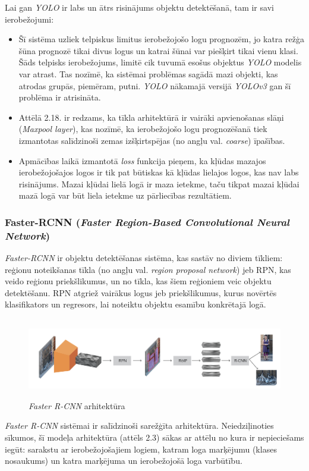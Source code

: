 Lai gan \textit{YOLO} ir labs un ātrs risinājums objektu detektēšanā, tam ir savi ierobežojumi:
\begin{itemize}
	\item Šī sistēma uzliek telpiskus limitus ierobežojošo logu prognozēm, jo katra režģa šūna prognozē tikai divus logus un katrai šūnai var piešķirt tikai vienu klasi. Šāds telpisks ierobežojums, limitē cik tuvumā esošus objektus \textit{YOLO} modelis var atrast. Tas nozīmē, ka sistēmai problēmas sagādā mazi objekti, kas atrodas grupās, piemēram, putni. \textit{YOLO} nākamajā versijā \textit{YOLOv3} gan šī problēma ir atrisināta.
	\item Attēlā 2.18. ir redzams, ka tīkla arhitektūrā ir vairāki apvienošanas slāņi (\textit{Maxpool layer}), kas nozīmē, ka ierobežojošo logu prognozēšanā tiek izmantotas salīdzinoši zemas izšķirtspējas (no angļu val. \textit{coarse}) īpašības. 
	\item Apmācības laikā izmantotā \textit{loss} funkcija pieņem, ka kļūdas mazajos ierobežojošajos logos ir tik pat būtiskas kā kļūdas lielajos logos, kas nav labs risinājums. Mazai kļūdai lielā logā ir maza ietekme, taču tikpat mazai kļūdai mazā logā var būt liela ietekme uz pārliecības rezultātiem. 
\end{itemize}   

\subsubsection{Faster-RCNN (\textit{Faster Region-Based Convolutional Neural Network})}
\textit{Faster-RCNN} ir objektu detektēšanas sistēma, kas sastāv no diviem tīkliem: reģionu noteikšanas tīkla (no angļu val. \textit{region proposal network}) jeb RPN, kas veido reģionu priekšlikumus, un no tīkla, kas šiem reģioniem veic objektu detektēšanu. RPN atgriež vairākus logus jeb priekšlikumus, kurus novērtēs klasifikators un regresors, lai noteiktu objektu esamību konkrētajā logā.

\begin{figure}[h]%
	\centering
	\includegraphics[height=3.5cm]{images/fastercnnarch.png} %
	\caption{\textit{Faster R-CNN} arhitektūra \cite{fasterrcnn}}%
	\label{fig:example}%
\end{figure}
\textit{Faster R-CNN} sistēmai ir salīdzinoši sarežģīta arhitektūra. Neiedziļinoties sīkumos, šī modeļa arhitektūra (attēls 2.3) sākas ar attēlu no kura ir nepieciešams iegūt: sarakstu ar ierobežojošajiem logiem, katram loga marķējumu (klases nosaukums) un katra marķējuma un ierobežojošā loga varbūtību. 

